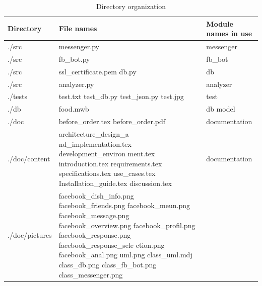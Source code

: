 \begin{table}[htbp]
\caption{Directory organization}
\begin{tabularx}{\linewidth}{|X|X|X|}
\toprule
Directory & File names & Module names in use  \\
\midrule
./src & messenger.py & messenger  \newline\\
./src & fb\_bot.py &  fb\_bot\newline \\
./src & ssl\_certificate.pem db.py \newline  & db \\
./src & analyzer.py & analyzer \newline \\
./tests & 
test.txt \newline 
test\_db.py \newline
test\_json.py	 \newline
test.jpg  \newline
& test\\
./db & food.mwb \newline & db model  \\
./doc & before\_order.tex before\_order.pdf \newline & documentation  \\
./doc/content & architecture\_design\_a nd\_implementation.tex development\_environ ment.tex introduction.tex requirements.tex specifications.tex use\_cases.tex Installation\_guide.tex discussion.tex \newline & documentation \\
./doc/pictures & 
facebook\_dish\_info.png \newline
facebook\_friends.png \newline
facebook\_meun.png \newline
facebook\_message.png \newline
facebook\_overview.png \newline
facebook\_profil.png \newline
facebook\_response.png \newline
facebook\_response\_sele ction.png\newline
facebook\_anal.png\newline
uml.png \newline
class\_uml.mdj \newline
class\_db.png \newline
class\_fb\_bot.png \newline
class\_messenger.png \newline

\end{tabularx}
\end{table}
